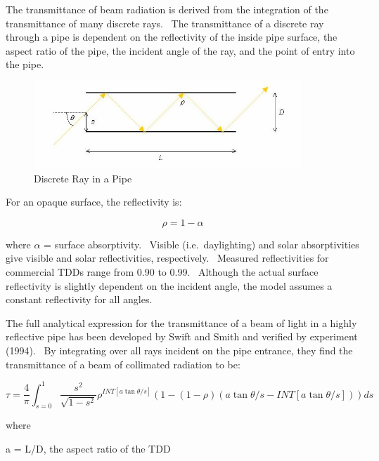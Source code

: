The transmittance of beam radiation is derived from the integration of the transmittance of many discrete rays.~ The transmittance of a discrete ray through a pipe is dependent on the reflectivity of the inside pipe surface, the aspect ratio of the pipe, the incident angle of the ray, and the point of entry into the pipe.

\begin{figure}[hbtp] %
\centering
\includegraphics[width=0.9\textwidth, height=0.9\textheight, keepaspectratio=true]{media/image871.png}
\caption{Discrete Ray in a Pipe \protect \label{fig:discrete-ray-in-a-pipe}}
\end{figure}

For an opaque surface, the reflectivity is:

\begin{equation}
\rho  = 1 - \alpha
\end{equation}

where \(\alpha\) = surface absorptivity.~ Visible (i.e.~daylighting) and solar absorptivities give visible and solar reflectivities, respectively.~ Measured reflectivities for commercial TDDs range from 0.90 to 0.99.~ Although the actual surface reflectivity is slightly dependent on the incident angle, the model assumes a constant reflectivity for all angles.

The full analytical expression for the transmittance of a beam of light in a highly reflective pipe has been developed by Swift and Smith and verified by experiment (1994).~ By integrating over all rays incident on the pipe entrance, they find the transmittance of a beam of collimated radiation to be:

\begin{equation}
\tau  = \frac{4}{\pi }\int_{s = 0}^1 {\frac{{{s^2}}}{{\sqrt {1 - {s^2}} }}} {\rho ^{INT\left[ {a\tan \theta /s} \right]}}\left( {1 - \left( {1 - \rho } \right)\left( {a\tan \theta /s - INT\left[ {a\tan \theta /s} \right]} \right)} \right)ds
\end{equation}

where

a = L/D, the aspect ratio of the TDD

